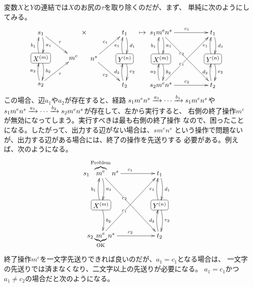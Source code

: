 {	変数$X$と$Y$の連結では$X$のお尻の$\tau$を取り除くのだが、まず、
	単純に次のようにしてみる。
	\begin{equation*}\begin{split}
		\xymatrix{
			s_1 \ar@/^1ex/[d]^{a_1} \ar[rd]^\tau \\
			*+[F-:<3pt>]{X^{(m)}} \ar@/^1ex/[u]^{b_1} \ar@/^1ex/[d]^{b_2} & m^e \\
			s_2 \ar@/^1ex/[u]^{a_2} \ar[ru]_\tau \\
		}\times \xymatrix{
			& t_1 \ar@/^1ex/[d]^{d_1} \\
			n^s \ar[ru]^{c_1} \ar[rd]_{c_2} & *+[F-:<3pt>]{Y^{(n)}}
				\ar@/^1ex/[u]^{e_1} \ar@/^1ex/[d]^{e_2} \\
			& t_2 \ar@/^1ex/[u]^{d_2} \\
		}\mapsto
		\xymatrix@C+2em{
			s_1m^en^s \ar@/^1ex/[d]^{a_1} \ar[r]^{c_1} \ar[rdd]|(0.4){c_2}
			& t_1 \ar@/^1ex/[d]^{d_1} \\
			*+[F-:<3pt>]{X^{(m)}} \ar@/^1ex/[u]^{b_1} \ar@/^1ex/[d]^{b_2}
			& *+[F-:<3pt>]{Y^{(n)}} \ar@/^1ex/[u]^{e_1} \ar@/^1ex/[d]^{e_2} \\
			s_2m^en^s \ar@/^1ex/[u]^{a_2} \ar[ruu]|(0.4){c_1} \ar[r]^{c_2}
			& t_2 \ar@/^1ex/[u]^{d_2} \\
		}
	\end{split}\end{equation*}
	この場合、辺$a_1$や$a_2$が存在すると、経路
	$s_1m^en^s\xrightarrow[{}]{a_1}\cdots\xrightarrow[{}]{b_1}s_1m^en^s$や
	$s_1m^en^s\xrightarrow[{}]{a_1}\cdots\xrightarrow[{}]{b_2}s_2m^en^s$が存在して、左から実行すると、
	右側の終了操作$m^e$が無効になってしまう。実行すべきは最も右側の終了操作
	なので、困ったことになる。したがって、出力する辺がない場合は、$sm^en^s$
	という操作で問題ないが、出力する辺がある場合には、終了の操作を先送りする
	必要がある。例えば、次のようになる。
	\begin{equation*}\xymatrix@C+2em{
		s_1\overbrace{m^e}^{\text{Problem}}n^s \ar@/^1ex/[d]^{a_1}
			\ar[r]^{c_1} \ar[rdd]|(0.4){c_2}
		& t_1 \ar@/^1ex/[d]^{d_1} \\
		*+[F-:<3pt>]{X^{(m)}} \ar@/^1ex/[u]^{b_1} \ar@/^1ex/[d]^{b_2}
		& *+[F-:<3pt>]{Y^{(n)}} \ar@/^1ex/[u]^{e_1} \ar@/^1ex/[d]^{e_2} \\
		s_2\underbrace{m^e}_{\text{OK}}n^s \ar[ruu]|(0.4){c_1} \ar[r]^{c_2}
		& t_2 \ar@/^1ex/[u]^{d_2} \\
	}\end{equation*}
	終了操作$m^e$を一文字先送りできれば良いのだが、$a_1=c_1$となる場合は、
	一文字の先送りでは済まなくなり、二文字以上の先送りが必要になる。
	$a_1=c_1$かつ$a_1\neq c_2$の場合だと次のようになる。
}
